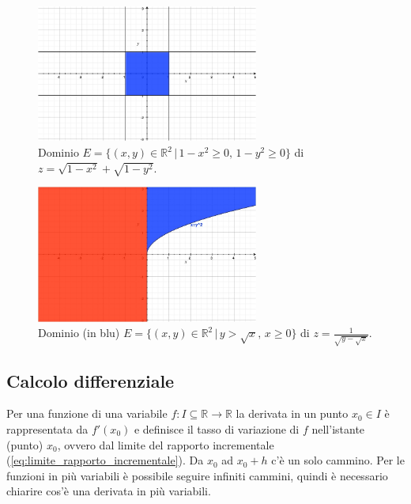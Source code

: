 \begin{example}
    \begin{figure}
    \centering
    \includegraphics[width=0.65\textwidth]{Analisi2/figures/dominio_rad_1-x^2+rad_1-y^2.jpg}
        \caption{Dominio $E=\{(x,y)\in\mathbb R^2\,|\, 1-x^2\geq 0,\, 1-y^2\geq 0\}$ di $z=\sqrt{1-x^2}+\sqrt{1-y^2}$.}\label{fig:dominio_rad_1-x^2+rad_1-y^2}
    \end{figure}

    \begin{figure}
    \centering
    \includegraphics[width=0.65\textwidth]{Analisi2/figures/domino_frac_1_rad_y-radx.jpg}
        \caption{Dominio (in blu) $E=\{(x,y)\in\mathbb R^2\,|\, y>\sqrt{x},\, x\geq 0\}$ di $z=\frac{1}{\sqrt{y-\sqrt{x}}}$.}\label{fig:domino_frac_1_rad_y-radx}
    \end{figure}
\end{example}

\subsection{Calcolo differenziale}
Per una funzione di una variabile $f:I\subseteq\mathbb R\rightarrow\mathbb R$ la derivata in un punto $x_0\in I$ è rappresentata da $f'(x_0)$ e definisce il tasso di variazione di $f$ nell'istante (punto) $x_0$, ovvero dal limite del rapporto incrementale (\ref{eq:limite_rapporto_incrementale}). Da $x_0$ ad $x_0+h$ c'è un solo cammino. Per le funzioni in più variabili è possibile seguire infiniti cammini, quindi è necessario chiarire cos'è una derivata in più variabili.
